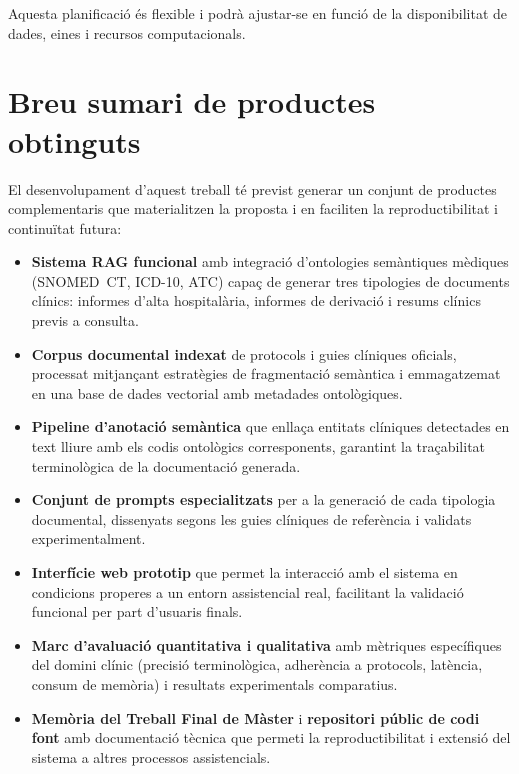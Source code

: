 \documentclass[CAT]{TFUOC}%
\begin{document}
Aquesta planificació és flexible i podrà ajustar-se en funció de la disponibilitat de dades, eines i recursos computacionals.

\section{Breu sumari de productes obtinguts}

El desenvolupament d'aquest treball té previst generar un conjunt de productes complementaris que materialitzen la proposta i en faciliten la reproductibilitat i continuïtat futura:

\begin{itemize}
    \item \textbf{Sistema RAG funcional} amb integració d'ontologies semàntiques mèdiques (SNOMED~CT, ICD-10, ATC) capaç de generar tres tipologies de documents clínics: informes d'alta hospitalària, informes de derivació i resums clínics previs a consulta.

    \item \textbf{Corpus documental indexat} de protocols i guies clíniques oficials, processat mitjançant estratègies de fragmentació semàntica i emmagatzemat en una base de dades vectorial amb metadades ontològiques.

    \item \textbf{Pipeline d'anotació semàntica} que enllaça entitats clíniques detectades en text lliure amb els codis ontològics corresponents, garantint la traçabilitat terminològica de la documentació generada.

    \item \textbf{Conjunt de prompts especialitzats} per a la generació de cada tipologia documental, dissenyats segons les guies clíniques de referència i validats experimentalment.

    \item \textbf{Interfície web prototip} que permet la interacció amb el sistema en condicions properes a un entorn assistencial real, facilitant la validació funcional per part d'usuaris finals.

    \item \textbf{Marc d'avaluació quantitativa i qualitativa} amb mètriques específiques del domini clínic (precisió terminològica, adherència a protocols, latència, consum de memòria) i resultats experimentals comparatius.

    \item \textbf{Memòria del Treball Final de Màster} i \textbf{repositori públic de codi font} amb documentació tècnica que permeti la reproductibilitat i extensió del sistema a altres processos assistencials.
\end{itemize}
\end{document}
